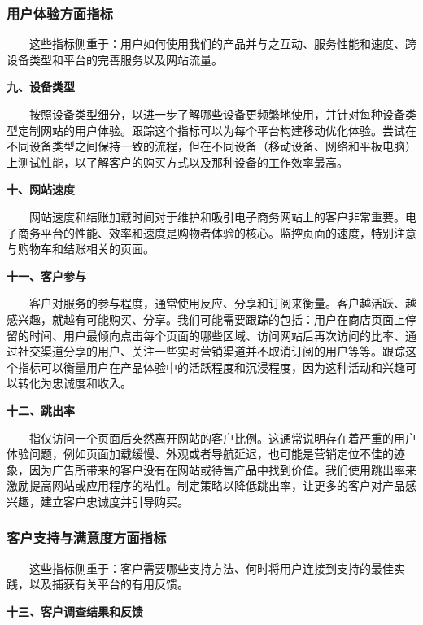 \documentclass[
  letterpaper,
  DIV=11,
  numbers=noendperiod]{scrreprt}
\begin{document}
\subsubsection{\texorpdfstring{\textbf{用户体验方面指标}}{用户体验方面指标}}\label{ux7528ux6237ux4f53ux9a8cux65b9ux9762ux6307ux6807}

  这些指标侧重于：用户如何使用我们的产品并与之互动、服务性能和速度、跨设备类型和平台的完善服务以及网站流量。

\textbf{九、设备类型}

  按照设备类型细分，以进一步了解哪些设备更频繁地使用，并针对每种设备类型定制网站的用户体验。跟踪这个指标可以为每个平台构建移动优化体验。尝试在不同设备类型之间保持一致的流程，但在不同设备（移动设备、网络和平板电脑）上测试性能，以了解客户的购买方式以及那种设备的工作效率最高。

\textbf{十、网站速度}

  网站速度和结账加载时间对于维护和吸引电子商务网站上的客户非常重要。电子商务平台的性能、效率和速度是购物者体验的核心。监控页面的速度，特别注意与购物车和结账相关的页面。

\textbf{十一、客户参与}

  客户对服务的参与程度，通常使用反应、分享和订阅来衡量。客户越活跃、越感兴趣，就越有可能购买、分享。我们可能需要跟踪的包括：用户在商店页面上停留的时间、用户最倾向点击每个页面的哪些区域、访问网站后再次访问的比率、通过社交渠道分享的用户、关注一些实时营销渠道并不取消订阅的用户等等。跟踪这个指标可以衡量用户在产品体验中的活跃程度和沉浸程度，因为这种活动和兴趣可以转化为忠诚度和收入。

\textbf{十二、跳出率}

  指仅访问一个页面后突然离开网站的客户比例。这通常说明存在着严重的用户体验问题，例如页面加载缓慢、外观或者导航延迟，也可能是营销定位不佳的迹象，因为广告所带来的客户没有在网站或待售产品中找到价值。我们使用跳出率来激励提高网站或应用程序的粘性。制定策略以降低跳出率，让更多的客户对产品感兴趣，建立客户忠诚度并引导购买。

\subsubsection{\texorpdfstring{\textbf{客户支持与满意度方面指标}}{客户支持与满意度方面指标}}\label{ux5ba2ux6237ux652fux6301ux4e0eux6ee1ux610fux5ea6ux65b9ux9762ux6307ux6807}

  这些指标侧重于：客户需要哪些支持方法、何时将用户连接到支持的最佳实践，以及捕获有关平台的有用反馈。

\textbf{十三、客户调查结果和反馈}
\end{document}
